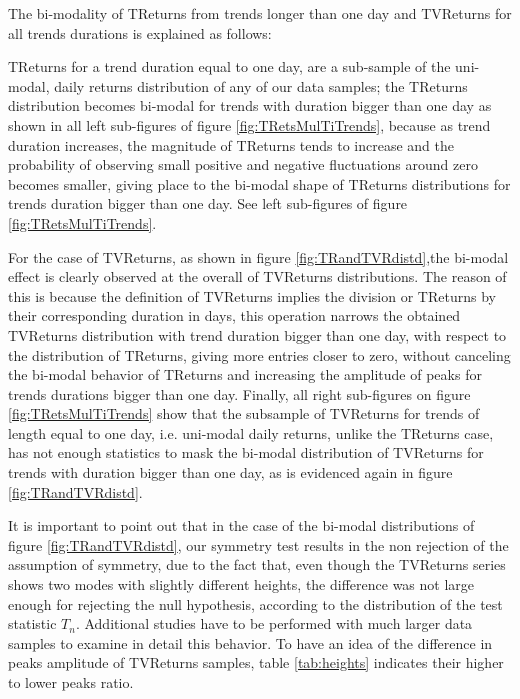 \documentclass{elsarticle}
\begin{document}
The bi-modality of TReturns from trends longer than one day and TVReturns for all trends durations is explained as follows:

TReturns for a trend duration equal to one day, are a sub-sample of the uni-modal, daily returns distribution of any of our data samples; the TReturns distribution becomes bi-modal for trends with duration bigger than one day as  shown in all left sub-figures of figure \ref{fig:TRetsMulTiTrends}, because as trend duration increases, the magnitude of TReturns tends to increase and the probability of observing small positive and negative fluctuations around zero becomes smaller, giving place to the bi-modal shape of TReturns distributions for trends duration bigger than one day. See left sub-figures of figure \ref{fig:TRetsMulTiTrends}.

For the case of TVReturns, as shown in figure \ref{fig:TRandTVRdistd},the bi-modal effect is clearly observed at the overall of TVReturns distributions. The reason of this is because the definition of TVReturns implies the division or TReturns by their corresponding duration in days, this operation narrows the obtained TVReturns distribution with trend duration bigger than one day, with respect to the distribution of TReturns, giving more entries closer to zero, without canceling the bi-modal behavior of TReturns and increasing the amplitude of peaks for trends durations bigger than one day. Finally, all right sub-figures on figure \ref{fig:TRetsMulTiTrends} show that the subsample of TVReturns for trends of length equal to one day, i.e. uni-modal daily returns, unlike the TReturns case, has not enough statistics to mask the bi-modal distribution of TVReturns for trends with duration bigger than one day, as is evidenced again in figure \ref{fig:TRandTVRdistd}.

It is important to point out that in the case of the bi-modal distributions of figure \ref{fig:TRandTVRdistd}, our symmetry test results in the non rejection of the assumption of symmetry, due to the fact that, even though the TVReturns series shows two modes with slightly different heights, the difference was not large enough for rejecting the null hypothesis, according to the distribution of the test statistic $T_n$. Additional studies have to be performed with much larger data samples to examine in detail this behavior. To have an idea of the difference in peaks amplitude of TVReturns samples, table \ref{tab:heights} indicates their higher to lower peaks ratio.
\end{document}
